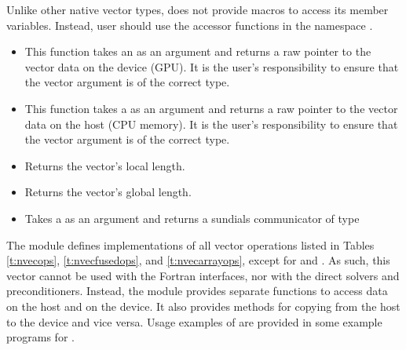 Unlike other native {\sundials} vector types, {\nveccuda} does not provide macros
to access its member variables. Instead, user should use the accessor functions in
the namespace .
\begin{itemize}

\item

  This function takes an  as an argument and returns a raw pointer to the vector
  data on the device (GPU). It is the user's responsibility to ensure that the vector argument 
  is of the correct  type.

\item

  This function takes a  as an argument and returns a raw pointer to the vector
  data on the host (CPU memory). It is the user's responsibility to ensure that the vector argument 
  is of the correct  type.

\item {}

  Returns the vector's local length.

\item {}

  Returns the vector's global length.

\item {}

  Takes a  as an argument and returns a sundials communicator of type

\end{itemize}


The {\nveccuda} module defines implementations of all vector operations listed
in Tables \ref{t:nvecops}, \ref{t:nvecfusedops}, and \ref{t:nvecarrayops}, except
for  and .
As such, this vector cannot be used with the {\sundials} Fortran interfaces,
nor with the {\sundials} direct solvers and preconditioners. Instead,
the {\nveccuda} module provides separate functions to access data on the host
and on the device. It also provides methods for copying from the host to
the device and vice versa. Usage examples of {\nveccuda} are provided in
some example programs for {\cvode} \cite{cvode_ex}.

